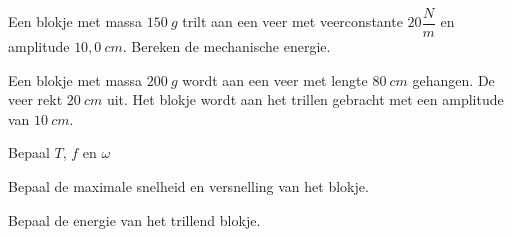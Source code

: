\documentclass{ximera}
\begin{document}

\begin{exercise} 
    Een blokje met massa $150 \ g$ trilt aan een veer met veerconstante $20 \dfrac{N}{m}$ en amplitude $10,0 \ cm$. 
    Bereken de mechanische energie.
\end{exercise}

\begin{exercise} 
    Een blokje met massa $200 \ g$ wordt aan een veer met lengte $80 \ cm$ gehangen. De veer rekt $20 \ cm$ uit. 
    Het blokje wordt aan het trillen gebracht met een amplitude van $10 \ cm$.
        \begin{question}
	   Bepaal $T$, $f$ en $\omega$
        \end{question}

        \begin{question}
        Bepaal de maximale snelheid en versnelling van het blokje. 
        \end{question}

        \begin{question}
          Bepaal de energie van het trillend blokje.  
        \end{question}
\end{exercise}
\end{document}
